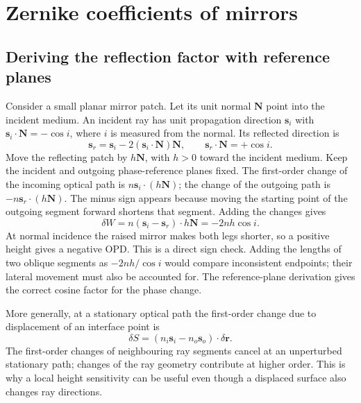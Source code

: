 \chapter{Zernike coefficients of mirrors}
\label{zc:mirrors}

\section{Deriving the reflection factor with reference planes}
Consider a small planar mirror patch. Let its unit normal $\bm N$ point
into the incident medium. An incident ray has unit propagation direction
$\bm s_i$ with $\bm s_i\cdot\bm N=-\cos i$, where $i$ is measured
from the normal. Its reflected direction is
\begin{equation}
 \bm s_r=\bm s_i-2(\bm s_i\cdot\bm N)\bm N,
 \qquad \bm s_r\cdot\bm N=+\cos i.
\end{equation}
Move the reflecting patch by $h\bm N$, with $h>0$ toward the incident
medium. Keep the incident and outgoing phase-reference planes fixed.
The first-order change of the incoming optical path is
$n\bm s_i\cdot(h\bm N)$; the change of the outgoing path is
$-n\bm s_r\cdot(h\bm N)$. The minus sign appears because moving the
starting point of the outgoing segment forward shortens that segment.
Adding the changes gives
\begin{equation}
 \boxed{\delta W=n(\bm s_i-\bm s_r)\cdot h\bm N
                  =-2nh\cos i.}
 \label{zc:mirrorfactor}
\end{equation}
At normal incidence the raised mirror makes both legs shorter, so a
positive height gives a negative OPD. This is a direct sign check.
Adding the lengths of two oblique segments as $-2nh/\cos i$ would
compare inconsistent endpoints; their lateral movement must also be
accounted for. The reference-plane derivation gives the correct cosine
factor for the phase change.

More generally, at a stationary optical path the first-order change due
to displacement of an interface point is
\begin{equation}
 \delta S=(n_i\bm s_i-n_o\bm s_o)\cdot\delta\bm r.
 \label{zc:boundaryvariation}
\end{equation}
The first-order changes of neighbouring ray segments cancel at an
unperturbed stationary path; changes of the ray geometry contribute at
higher order. This is why a local height sensitivity can be useful even
though a displaced surface also changes ray directions.

